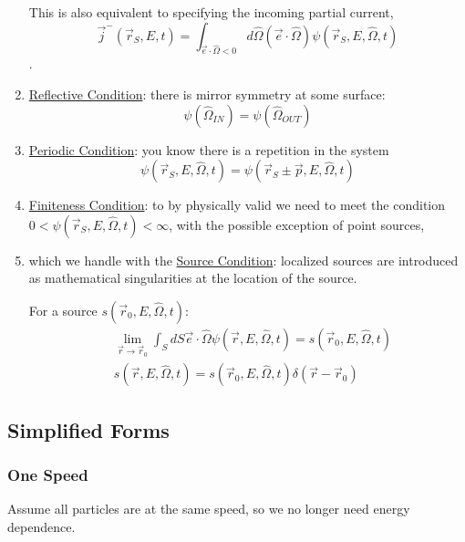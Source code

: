 \documentclass[12pt]{article}
\newcommand{\vOmega}{\ensuremath{\hat{\Omega}}}
\begin{document}
\begin{enumerate}
\begin{minipage}{0.5\textwidth}
This is also equivalent to specifying the incoming partial current, $$\vec{j}^-(\vec{r}_S, E, t) = \int_{\vec{e} \cdot \vOmega < 0} d\vOmega (\vec{e} \cdot \vOmega) \psi(\vec{r}_S, E, \vOmega, t)$$.
\end{minipage}

\item \underline{Reflective Condition}: there is mirror symmetry at some surface:
\[\psi(\vOmega_{IN}) = \psi(\vOmega_{OUT})\]

\item \underline{Periodic Condition}: you know there is a repetition in the system
\[\psi(\vec{r}_S, E, \vOmega, t) = \psi(\vec{r}_S \pm \vec{p}, E, \vOmega, t)\]

\item \underline{Finiteness Condition}: to by physically valid we need to meet the condition $0 < \psi(\vec{r}_S, E, \vOmega, t) < \infty$, with the possible exception of point sources,

\item which we handle with the \underline{Source Condition}: localized sources are introduced as mathematical singularities at the location of the source.

For a source $s(\vec{r}_0, E, \vOmega, t)$:
\begin{align}
&\lim_{\vec{r} \rightarrow \vec{r}_0} \int_S dS \vec{e} \cdot \vOmega \psi(\vec{r}, E, \vOmega, t) = s(\vec{r}_0, E, \vOmega, t) \\
&s(\vec{r}, E, \vOmega, t) = s(\vec{r}_0, E, \vOmega, t)\delta(\vec{r} - \vec{r}_0)
\end{align}
\end{enumerate}


\subsection{Simplified Forms}

\subsubsection{One Speed}
Assume all particles are at the same speed, so we no longer need energy dependence.

%
\end{document}
